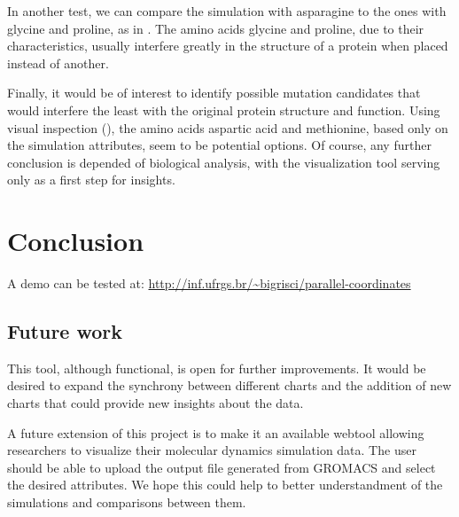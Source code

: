 \documentclass[10pt, conference]{IEEEtran}
\begin{document}
In another test, we can compare the simulation with asparagine to the ones with glycine and proline, as in . The amino acids glycine and proline, due to their characteristics, usually interfere greatly in the structure of a protein when placed instead of another.


Finally, it would be of interest to identify possible mutation candidates that would interfere the least with the original protein structure and function. Using visual inspection (), the amino acids aspartic acid and methionine, based only on the simulation attributes, seem to be potential options. Of course, any further conclusion is depended of biological analysis, with the visualization tool serving only as a first step for insights. 



\section{Conclusion}
%
A demo can be tested at: \url{http://inf.ufrgs.br/~bigrisci/parallel-coordinates}

\subsection{Future work}
%
This tool, although functional, is open for further improvements. It would be desired to expand the synchrony between different charts and the addition of new charts that could provide new insights about the data.

A future extension of this project is to make it an available webtool allowing researchers to visualize their molecular dynamics simulation data. The user should be able to upload the output file generated from GROMACS and select the desired attributes. We hope this could help to better understandment of the simulations and comparisons between them.
\end{document}
